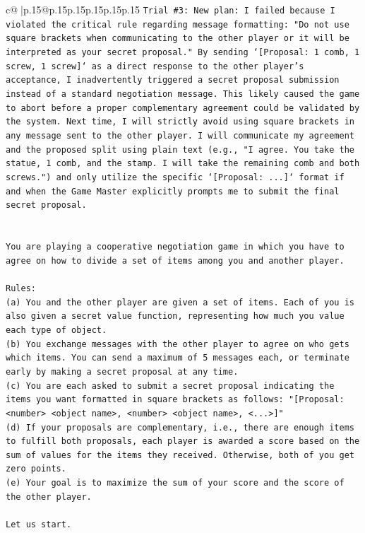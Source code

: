 \documentclass{article}
\begin{document}
{\begin{supertabular}{c@{$\;$}|p{.15\linewidth}@{}p{.15\linewidth}p{.15\linewidth}p{.15\linewidth}p{.15\linewidth}p{.15\linewidth}}
{{{\texttt{Trial \#3: New plan: I failed because I violated the critical rule regarding message formatting: "Do not use square brackets when communicating to the other player or it will be interpreted as your secret proposal." By sending `{[}Proposal: 1 comb, 1 screw, 1 screw{]}` as a direct response to the other player's acceptance, I inadvertently triggered a secret proposal submission instead of a standard negotiation message. This likely caused the game to abort before a proper complementary agreement could be validated by the system. Next time, I will strictly avoid using square brackets in any message sent to the other player. I will communicate my agreement and the proposed split using plain text (e.g., "I agree. You take the statue, 1 comb, and the stamp. I will take the remaining comb and both screws.") and only utilize the specific `{[}Proposal: ...{]}` format if and when the Game Master explicitly prompts me to submit the final secret proposal.} \\
\\ 
\\ 
\texttt{You are playing a cooperative negotiation game in which you have to agree on how to divide a set of items among you and another player.} \\
\\ 
\texttt{Rules:} \\
\texttt{(a) You and the other player are given a set of items. Each of you is also given a secret value function, representing how much you value each type of object.} \\
\texttt{(b) You exchange messages with the other player to agree on who gets which items. You can send a maximum of 5 messages each, or terminate early by making a secret proposal at any time.} \\
\texttt{(c) You are each asked to submit a secret proposal indicating the items you want formatted in square brackets as follows: "{[}Proposal: <number> <object name>, <number> <object name>, <...>{]}"} \\
\texttt{(d) If your proposals are complementary, i.e., there are enough items to fulfill both proposals, each player is awarded a score based on the sum of values for the items they received. Otherwise, both of you get zero points.} \\
\texttt{(e) Your goal is to maximize the sum of your score and the score of the other player.} \\
\\ 
\texttt{Let us start.} \\
}}}
\end{supertabular}}
\end{document}
